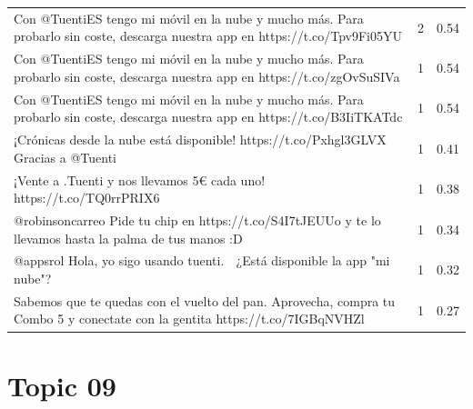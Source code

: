 \begin{longtable}{p{12.5cm}rr}
Con @TuentiES tengo mi móvil en la nube y mucho más. Para probarlo sin coste, descarga nuestra app en https://t.co/Tpv9Fi05YU & 2 & 0.54 \\
Con @TuentiES tengo mi móvil en la nube y mucho más. Para probarlo sin coste, descarga nuestra app en https://t.co/zgOvSuSIVa & 1 & 0.54 \\
Con @TuentiES tengo mi móvil en la nube y mucho más. Para probarlo sin coste, descarga nuestra app en https://t.co/B3IiTKATdc & 1 & 0.54 \\
¡Crónicas desde la nube está disponible! https://t.co/Pxhgl3GLVX Gracias a @Tuenti & 1 & 0.41 \\
¡Vente a .Tuenti y nos llevamos 5€ cada uno! https://t.co/TQ0rrPRIX6 & 1 & 0.38 \\
@robinsoncarreo  Pide tu chip en https://t.co/S4I7tJEUUo y te lo llevamos hasta la palma de tus manos :D & 1 & 0.34 \\
@appsrol Hola, yo sigo usando tuenti. 👀 ¿Está disponible la app "mi nube"? & 1 & 0.32 \\
Sabemos que te quedas con el vuelto del pan. Aprovecha, compra tu Combo 5 y conectate con la gentita https://t.co/7IGBqNVHZl & 1 & 0.27 \\

\end{longtable}
\clearpage

\section{Topic 09}

